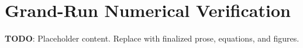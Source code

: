 
\section{Grand-Run Numerical Verification}
\label{sec:grand-run-numerical-verification}

\textbf{TODO}: Placeholder content. Replace with finalized prose, equations, and figures.


